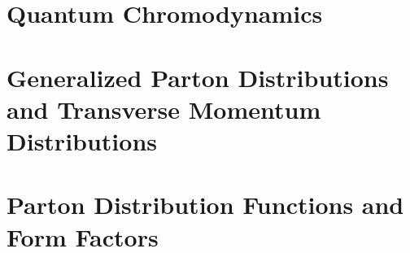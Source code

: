 \label{Chapter-2}

\hypertarget{Section-2.1}{%
\section{Quantum Chromodynamics}\label{Section-2.1}}

\hypertarget{Section-2.2}{%
\section{Generalized Parton Distributions and Transverse Momentum
Distributions}\label{Section-2.2}}

\hypertarget{Section-2.3}{%
\section{Parton Distribution Functions and Form
Factors}\label{Section-2.3}}


